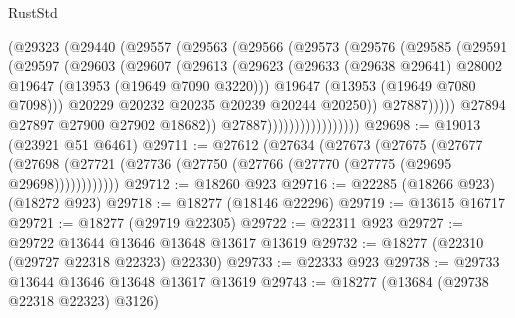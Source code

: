 \begin{lexlean}{RustStd}
\begin{coremodule}
                              (@29323
                                (@29440
                                  (@29557
                                    (@29563
                                      (@29566
                                        (@29573
                                          (@29576
                                            (@29585
                                              (@29591
                                                (@29597
                                                  (@29603
                                                    (@29607
                                                      (@29613
                                                        (@29623
                                                          (@29633
                                                            (@29638 @29641)
                                                            @28002
                                                            @19647
                                                            (@13953 (@19649 @7090 @3220)))
                                                          @19647
                                                          (@13953 (@19649 @7080 @7098)))
                                                        @20229
                                                        @20232
                                                        @20235
                                                        @20239
                                                        @20244
                                                        @20250))
                                                    @27887)))))
                                          @27894
                                          @27897
                                          @27900
                                          @27902
                                          @18682))
                                      @27887)))))))))))))))))
@29698 := @19013 (@23921 @51 @6461)
@29711 := @27612
    (@27634
      (@27673
        (@27675
          (@27677 (@27698 (@27721 (@27736 (@27750 (@27766 (@27770 (@27775 (@29695 @29698))))))))))))
@29712 := @18260 @923
@29716 := @22285 (@18266 @923) (@18272 @923)
@29718 := @18277 (@18146 @22296)
@29719 := @13615 @16717
@29721 := @18277 (@29719 @22305)
@29722 := @22311 @923
@29727 := @29722 @13644 @13646 @13648 @13617 @13619
@29732 := @18277 (@22310 (@29727 @22318 @22323) @22330)
@29733 := @22333 @923
@29738 := @29733 @13644 @13646 @13648 @13617 @13619
@29743 := @18277 (@13684 (@29738 @22318 @22323) @3126)

\end{coremodule}
\end{lexlean}
